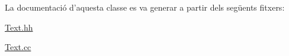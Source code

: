 La documentació d'aquesta classe es va generar a partir dels següents fitxers\+:\begin{DoxyCompactItemize}
\item 
\hyperlink{_text_8hh}{Text.\+hh}\item 
\hyperlink{_text_8cc}{Text.\+cc}\end{DoxyCompactItemize}
